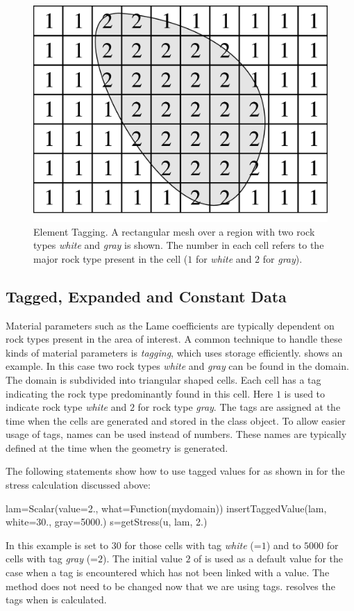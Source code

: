 \begin{figure}
\centering
\includegraphics{EscriptDiagram2}
\caption{\label{Figure: tag}Element Tagging. A rectangular mesh over a region
with two rock types {\it white} and {\it gray} is shown.
The number in each cell refers to the major rock type present in the cell
($1$ for {\it white} and $2$ for {\it gray}).}
\end{figure}

\subsection{Tagged, Expanded and Constant Data}
Material parameters such as the Lame coefficients are typically dependent on
rock types present in the area of interest.
A common technique to handle these kinds of material parameters is
\emph{tagging}, which uses storage efficiently.
 shows an example. In this case two rock types {\it white}
and {\it gray} can be found in the domain.
The domain is subdivided into triangular shaped cells.
Each cell has a tag indicating the rock type predominantly found in this cell.
Here $1$ is used to indicate rock type {\it white} and $2$ for rock type {\it gray}.
The tags are assigned at the time when the cells are generated and stored in
the \Domain class object. To allow easier usage of tags, names can be used
instead of numbers. These names are typically defined at the time when the
geometry is generated.

The following statements show how to use tagged values for  as shown
in  for the stress calculation discussed above:
\begin{python}
  lam=Scalar(value=2., what=Function(mydomain))
  insertTaggedValue(lam, white=30., gray=5000.)
  s=getStress(u, lam, 2.)
\end{python}
In this example  is set to $30$ for those cells with tag {\it white}
(=$1$) and to $5000$ for cells with tag {\it gray} (=$2$).
The initial value $2$ of  is used as a default value for the case
when a tag is encountered which has not been linked with a value.
The  method does not need to be changed now that we are using tags.
\escript resolves the tags when  is calculated.

